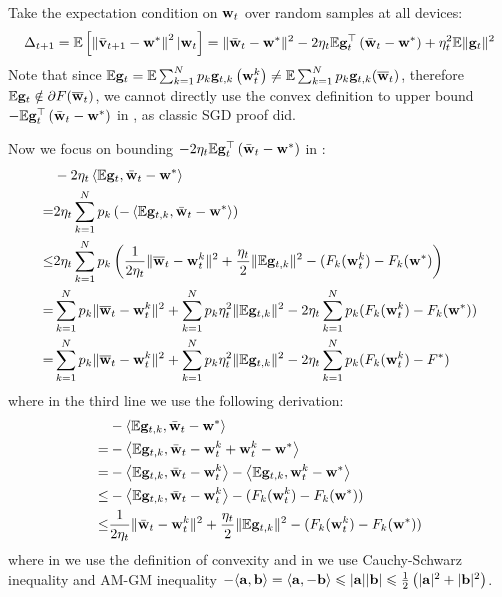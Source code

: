 Take the expectation condition on ${\mathbf{w}}_t$ over random samples at all devices:
\begin{align}
\Delta_{t+1} = \mathbb{E}\left[\left\|\bar{{\mathbf{v}}}_{t+1}-{\mathbf{w}}^{*}\right\|^2| {\mathbf{w}}_{t}\right]=\|\bar{{\mathbf{w}}}_{t}-{\mathbf{w}}^{*}\|^{2}-2 \eta_{t} \mathbb{E} {\mathbf{g}}_{t}^{\top}\left(\bar{{\mathbf{w}}}_{t}-{\mathbf{w}}^{*}\right)+\eta_{t}^{2} \mathbb{E}\| {\mathbf{g}}_{t} \|^{2}	
\label{eq:expand}
\end{align}
Note that since $\mathbb{E} {\mathbf{g}}_t = \mathbb{E} \sum_{k=1}^{N} p_{k} {\mathbf{g}}_{t, k}\left({\mathbf{w}}_{t}^{k}\right) \neq \mathbb{E} \sum_{k=1}^Np_k {\mathbf{g}}_{t,k}(\overline{{\mathbf{w}}}_t)$, therefore $\mathbb{E} {\mathbf{g}}_t \notin \partial F(\overline{{\mathbf{w}}}_t)$, we cannot directly use the convex definition to
upper bound $- \mathbb{E} {\mathbf{g}}_{t}^{\top}\left(\bar{{\mathbf{w}}}_{t}-{\mathbf{w}}^{*}\right)$ in \eq{\ref{eq:expand}}, as classic SGD proof did. 

Now we focus on bounding $-2 \eta_{t} \mathbb{E} {\mathbf{g}}_{t}^{\top}\left(\bar{{\mathbf{w}}}_{t}-{\mathbf{w}}^{*}\right)$ in \eq{\ref{eq:expand}}: 
\begin{align}
	& -2 \eta_{t} \left<\mathbb{E} {\mathbf{g}}_{t}, \bar{{\mathbf{w}}}_{t}-{\mathbf{w}}^{*} \right>\\
  = & 2 \eta_{t} \sum_{k=1}^N p_k \left(-\left<\mathbb{E} {\mathbf{g}}_{t,k}, \bar{{\mathbf{w}}}_{t}-{\mathbf{w}}^{*} \right> \right) \\
  \leq& 2 \eta_{t} \sum_{k=1}^N p_k  \left(\frac{1}{2\eta_t} \|\overline{{\mathbf{w}}}_t - {\mathbf{w}}_t^k\|^2 + \frac{\eta_t}{2} \|\mathbb{E} {\mathbf{g}}_{t,k}\|^2 - (F_k({\mathbf{w}}_t^k) - F_k({\mathbf{w}}^*) \right) \\
  =& \sum_{k=1}^N p_k \|\overline{{\mathbf{w}}}_t - {\mathbf{w}}_t^k\|^2 +  \sum_{k=1}^N p_k \eta_t^2 \|\mathbb{E} {\mathbf{g}}_{t,k}\|^2 
  - 2\eta_t\sum_{k=1}^N p_k (F_k({\mathbf{w}}_t^k) - F_k({\mathbf{w}}^*)) \\
  =& \sum_{k=1}^N p_k \|\overline{{\mathbf{w}}}_t - {\mathbf{w}}_t^k\|^2 +  \sum_{k=1}^N p_k \eta_t^2 \|\mathbb{E} {\mathbf{g}}_{t,k}\|^2 
  - 2\eta_t\sum_{k=1}^N p_k (F_k({\mathbf{w}}_t^k) - F^*) \label{eq:exp4}
\end{align}
where in the third line we use the following derivation:
\begin{align}
	& -\left<\mathbb{E} {\mathbf{g}}_{t,k}, \bar{{\mathbf{w}}}_{t} - {\mathbf{w}}^{*} \right>\\
=& - \left<\mathbb{E} {\mathbf{g}}_{t,k}, \bar{{\mathbf{w}}}_{t} - {\mathbf{w}}_t^k +  {\mathbf{w}}_t^k - {\mathbf{w}}^{*} \right>\\
=& - \left<\mathbb{E} {\mathbf{g}}_{t,k}, \bar{{\mathbf{w}}}_{t} - {\mathbf{w}}_t^k\right> - \left<\mathbb{E} {\mathbf{g}}_{t,k}, {\mathbf{w}}_t^k - {\mathbf{w}}^{*} \right>\\
\leq & - \left<\mathbb{E} {\mathbf{g}}_{t,k}, \bar{{\mathbf{w}}}_{t} - {\mathbf{w}}_t^k\right> - (F_k({\mathbf{w}}_t^k) - F_k({\mathbf{w}}^*)) \label{eq:3}\\
\leq & \frac{1}{2\eta_t} \|\bar{{\mathbf{w}}}_t - {\mathbf{w}}_t^k\|^2 + \frac{\eta_t}{2} \|\mathbb{E} {\mathbf{g}}_{t,k}\|^2
- (F_k({\mathbf{w}}_t^k) - F_k({\mathbf{w}}^*)) \label{eq:4}
\end{align}
where in \eq{\ref{eq:3}} we use the definition of convexity and in \eq{\ref{eq:4}} we use Cauchy-Schwarz inequality and AM-GM inequality $-\langle{\mathbf{a}}, {\mathbf{b}}\rangle=\langle{\mathbf{a}},-{\mathbf{b}}\rangle \leqslant|{\mathbf{a}}||{\mathbf{b}}| \leqslant \frac{1}{2}\left(|{\mathbf{a}}|^{2}+|{\mathbf{b}}|^{2}\right)$.


